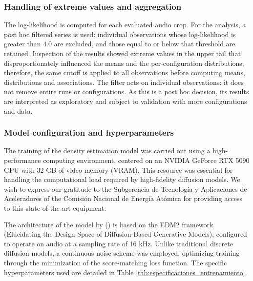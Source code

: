 \subsubsection{Handling of extreme values and aggregation}
The log-likelihood is computed for each evaluated audio crop. For the analysis, a post hoc filtered series is used: individual observations whose log-likelihood is greater than $4.0$ are excluded, and those equal to or below that threshold are retained. Inspection of the results showed extreme values in the upper tail that disproportionately influenced the means and the per-configuration distributions; therefore, the same cutoff is applied to all observations before computing means, distributions and associations. The filter acts on individual observations: it does not remove entire runs or configurations. As this is a post hoc decision, its results are interpreted as exploratory and subject to validation with more configurations and data.

\subsubsection{Model configuration and hyperparameters}
\label{sec:model_config}

The training of the density estimation model was carried out using a high-performance computing environment, centered on an NVIDIA GeForce RTX 5090 GPU with 32 GB of video memory (VRAM). This resource was essential for handling the computational load required by high-fidelity diffusion models. We wish to express our gratitude to the Subgerencia de Tecnología y Aplicaciones de Aceleradores of the Comisión Nacional de Energía Atómica for providing access to this state-of-the-art equipment.

The architecture of the model by (\cite{danilo2025_quality}) is based on the EDM2 framework (Elucidating the Design Space of Diffusion-Based Generative Models), configured to operate on audio at a sampling rate of 16 kHz. Unlike traditional discrete diffusion models, a continuous noise scheme was employed, optimizing training through the minimization of the score-matching loss function. The specific hyperparameters used are detailed in Table \ref{tab:especificaciones_entrenamiento}.

